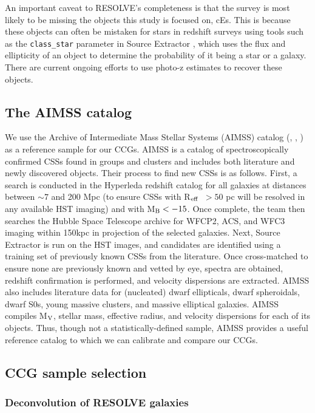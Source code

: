 \documentclass[iop,apj]{emulateapj}
\newcommand{\Reff}{R$_{\rm eff}$}
\begin{document}
An important caveat to RESOLVE's completeness is that the survey is most likely to be missing the objects this study is focused on, cEs. This is because these objects can often be mistaken for stars in redshift surveys using tools such as the \texttt{class\_star} parameter in Source Extractor \citep{Bertin1996}, which uses the flux and ellipticity of an object to determine the probability of it being a star or a galaxy. There are current ongoing efforts to use photo-z estimates to recover these objects.

\subsection{The AIMSS catalog}
\label{aimss}

\noindent We use the Archive of Intermediate Mass Stellar Systems (AIMSS) catalog (\citet{Norris2014}, \citet{Forbes2014}, \citet{Janz2015}) as a reference sample for our CCGs.  AIMSS is a catalog of spectroscopically confirmed CSSs found in groups and clusters and includes both literature and newly discovered objects. Their process to find new CSSs is as follows. First, a search is conducted in the Hyperleda redshift catalog \citep{Paturel2003} for all galaxies at distances between $\sim 7$ and 200 Mpc (to ensure CSSs with \Reff\ $> 50$ pc will be resolved in any available HST imaging) and with M$_{\rm B} < -15$. Once complete, the team then searches the Hubble Space Telescope archive for WFCP2, ACS, and WFC3 imaging within 150kpc in projection of the selected galaxies. Next, Source Extractor is run on the HST images, and candidates are identified using a training set of previously known CSSs from the literature. Once cross-matched to ensure none are previously known and vetted by eye, spectra are obtained, redshift confirmation is performed, and velocity dispersions are extracted. AIMSS also includes literature data for (nucleated) dwarf ellipticals, dwarf spheroidals, dwarf S0s, young massive clusters, and massive elliptical galaxies. AIMSS compiles M$_{\rm V}$, stellar mass, effective radius, and velocity dispersions for each of its objects. Thus, though not a statistically-defined sample, AIMSS provides a useful reference catalog to which we can calibrate and compare our CCGs.

\subsection{CCG sample selection}

\subsubsection{Deconvolution of RESOLVE galaxies}
\label{deconv}
\end{document}
